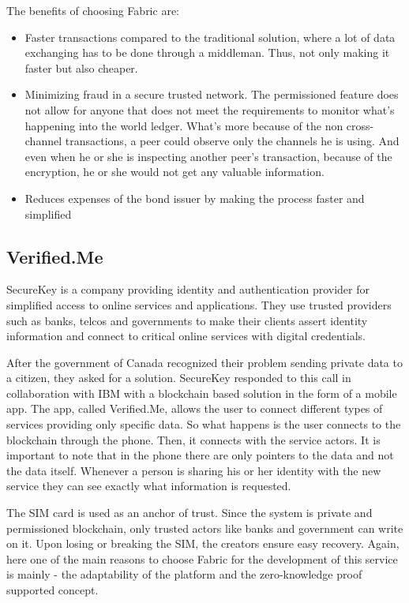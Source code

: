 \documentclass[a4paper,11pt]{report}
\begin{document}
The benefits of choosing Fabric are: 
\begin{itemize}
	
\item Faster transactions compared to the traditional solution, where a lot of data exchanging has to be done through a middleman. Thus, not only making it faster but also cheaper. 
\item Minimizing fraud in a secure trusted network. The permissioned feature does not allow for anyone that does not meet the requirements to monitor what’s happening into the world ledger. What’s more because of the non cross-channel transactions, a peer could observe only the channels he is using. And even when he or she is inspecting another peer’s transaction, because of the encryption, he or she would not get any valuable information. 
\item Reduces expenses of the bond issuer by making the process faster and simplified \cite{altorosDemo}
\end{itemize}

\subsection{Verified.Me}
\label{verifyMe}
SecureKey is a company providing identity and authentication provider for simplified access to online services and applications. They use trusted providers such as banks, telcos and governments to make their clients assert identity information and connect to critical online services with digital credentials.

After the government of Canada recognized their problem sending private data to a citizen, they asked for a solution. SecureKey responded to this call in collaboration with IBM with a blockchain based solution in the form of a mobile app. The app, called Verified.Me, allows the user to connect different types of services providing only specific data. So what happens is the user connects to the blockchain through the phone. Then, it connects with the service actors. It is important to note that in the phone there are only pointers to the data and not the data itself. Whenever a person is sharing his or her identity with the new service they can see exactly what information is requested.  \cite{verifyMe}

	The SIM card is used as an anchor of trust. Since the system is private and permissioned blockchain, only trusted actors like banks and government can write on it. Upon losing or breaking the SIM, the creators ensure easy recovery. 
Again, here one of the main reasons to choose Fabric for the development of this service is mainly - the adaptability of the platform and the zero-knowledge proof supported concept. \cite{verifyMeDemo}
\end{document}
